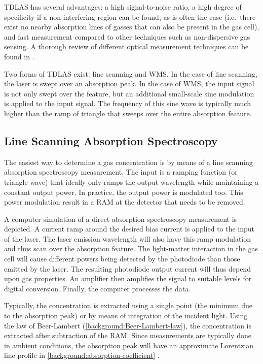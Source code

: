\documentclass[\home/main.tex]{subfiles}
\begin{document}
  \Acrshort{TDLAS} has several advantages: a high signal-to-noise ratio, a high degree of specificity if a non-interfering region can be found, as is often the case (i.e.\ there exist no nearby absorption lines of gasses that can also be present in the gas cell), and fast measurement compared to other techniques such as non-dispersive gas sensing. A thorough review of different optical measurement techniques can be found in \cite{OpticalGasSensingReview}. %

  Two forms of \acrshort{TDLAS} exist: line scanning and \acrshort{WMS}. In the case of line scanning, the laser is swept over an absorption peak. In the case of \acrshort{WMS}, the input signal is not only swept over the feature, but an additional small-scale sine modulation is applied to the input signal. The frequency of this sine wave is typically much higher than the ramp of triangle that sweeps over the entire absorption feature. 
  
  \subsection{Line Scanning Absorption Spectroscopy}\label{background:line-scanning-absorption-spectroscopy}
  
    The easiest way to determine a gas concentration is by means of a line scanning absorption spectroscopy measurement. The input is a ramping function (or triangle wave) that ideally only ramps the output wavelength while maintaining a constant output power. In practice, the output power is modulated too. This power modulation result in a \acrfull{RAM} at the detector that needs to be removed.
    
    A computer simulation of a direct absorption spectroscopy measurement is depicted. A current ramp around the desired bias current is applied to the input of the laser. The laser emission wavelength will also have this ramp modulation and thus scan over the absorption feature. The light-matter interaction in the gas cell will cause different powers being detected by the photodiode than those emitted by the laser. The resulting photodiode output current will thus depend upon gas properties. An amplifier then amplifies the signal to suitable levels for digital conversion. Finally, the computer processes the data.
    
    Typically, the concentration is extracted using a single point (the minimum due to the absorption peak) or by means of integration of the incident light. Using the law of Beer-Lambert (\cref{background:Beer-Lambert-law}), the concentration is extracted \cite{OpticalGasSensingReview} after subtraction of the \acrshort{RAM}. Since measurements are typically done in ambient conditions, the absorption peak will have an approximate Lorentzian line profile in \cref{background:absorption-coefficient} \cite{spectrochemical-analysis}.
    
\end{document}
